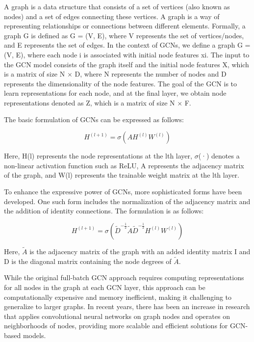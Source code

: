 A graph is a data structure that consists of a set of vertices (also known as nodes) and a set of edges connecting these vertices. A graph is a way of representing relationships or connections between different elements. Formally, a graph G is defined as G = (V, E), where V represents the set of vertices/nodes, and E represents the set of edges. In the context of GCNs, we define a graph G = (V, E), where each node i is associated with initial node features xi. The input to the GCN model consists of the graph itself and the initial node features X, which is a matrix of size N × D, where N represents the number of nodes and D represents the dimensionality of the node features. The goal of the GCN is to learn representations for each node, and at the final layer, we obtain node representations denoted as Z, which is a matrix of size N × F.

The basic formulation of GCNs can be expressed as follows:

\begin{equation}
H^{(l+1)} = \sigma(AH^{(l)}W^{(l)})
\end{equation}

Here, H(l) represents the node representations at the l\-th layer, $\sigma$(·) denotes a non-linear activation function such as ReLU, A represents the adjacency matrix of the graph, and W(l) represents the trainable weight matrix at the l\-th layer.

To enhance the expressive power of GCNs, more sophisticated forms have been developed. One such form includes the normalization of the adjacency matrix and the addition of identity connections. The formulation is as follows:

\begin{equation}
H^{(l+1)} = \sigma(\tilde{D}^{-\frac{1}{2}}\tilde{A}\tilde{D}^{-\frac{1}{2}}H^{(l)}W^{(l)})
\end{equation}

Here, $\tilde{A}$ is the adjacency matrix of the graph with an added identity matrix I and D is the diagonal matrix containing the node degrees of $\tilde{A}$.

While the original full-batch GCN approach requires computing representations for all nodes in the graph at each GCN layer, this approach can be computationally expensive and memory inefficient, making it challenging to generalize to larger graphs. In recent years, there has been an increase in research that applies convolutional neural networks on graph nodes and operates on neighborhoods of nodes, providing more scalable and efficient solutions for GCN-based models.

